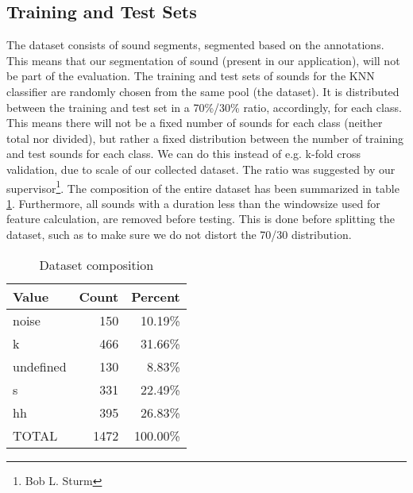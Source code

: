 	\subsection{Training and Test Sets}
		The dataset consists of sound segments, segmented based on the annotations. This means that our segmentation of sound (present in our application), will not be part of the evaluation.
		The training and test sets of sounds for the KNN classifier are randomly chosen from the same pool (the dataset). It is distributed between the training and test set in a 70\%/30\% ratio, accordingly, for each class. This means there will not be a fixed number of sounds for each class (neither total nor divided), but rather a fixed distribution between the number of training and test sounds for each class. We can do this instead of e.g. k-fold cross validation, due to scale of our collected dataset. The ratio was suggested by our supervisor\footnote{Bob L. Sturm}. The composition of the entire dataset has been summarized in table \ref{table:eval:datasetComposition}. 
		Furthermore, all sounds with a duration less than the windowsize used for feature calculation, are removed before testing. This is done before splitting the dataset, such as to make sure we do not distort the 70/30 distribution.

		\begin{table}
			\centering
			\begin{tabular}{|l|r|r|}
					\hline
					Value  &  Count  & Percent \\ \hline
			      noise    &  150    & 10.19\% \\ \hline
			          k    &  466    & 31.66\% \\ \hline
			  undefined    &  130    &  8.83\% \\ \hline
			          s    &  331    & 22.49\% \\ \hline
			         hh    &  395    & 26.83\% \\ \hline
			      TOTAL    &  1472	 & 100.00\% \\ \hline

			\end{tabular}
			\caption{Dataset composition}
			\label{table:eval:datasetComposition}
		\end{table}
		
		
